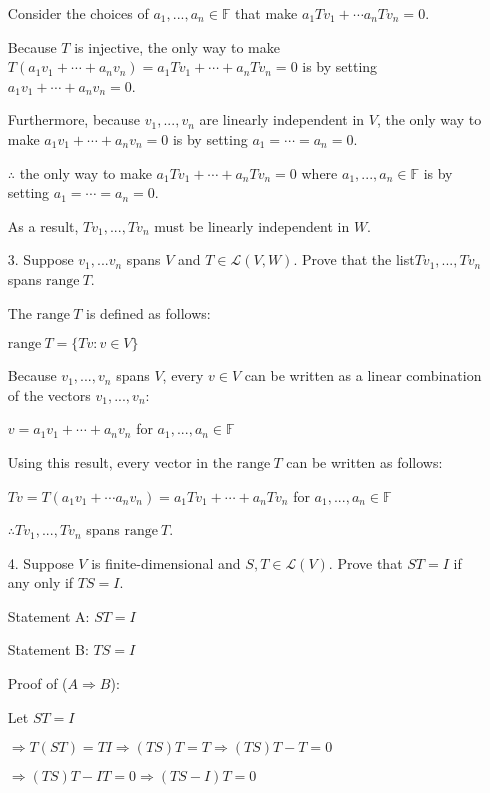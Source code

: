 \documentclass[fleqn]{article}
\begin{document}
\begin{enumerate}[nolistsep]
			Consider the choices of $a_1,...,a_n \in \mathbb{F}$ that make $a_1Tv_1 + \cdots a_nTv_n = 0$.
			
			Because $T$ is injective, the only way to make $T(a_1v_1 + \cdots + a_nv_n) = a_1Tv_1 + \cdots + a_nTv_n = 0$ is by setting $a_1v_1 + \cdots + a_nv_n = 0$.
			
			Furthermore, because $v_1,...,v_n$ are linearly independent in $V$, the only way to make $a_1v_1 + \cdots + a_nv_n = 0$ is by setting	$a_1 = \cdots = a_n = 0$.
			
			$\therefore$ the only way to make $a_1Tv_1 + \cdots + a_nTv_n = 0$ where $a_1,...,a_n \in \mathbb{F}$ is by setting $a_1 = \cdots = a_n = 0$.
			
			As a result, $Tv_1,...,Tv_n$ must be linearly independent in $W$.
	
		\item[3.] Suppose $v_1,...v_n$ spans $V$ and $T \in \mathcal{L}(V,W)$. Prove that the list\newline $Tv_1,...,Tv_n$ spans $\text{range}\ T$.

		The $\text{range}\ T$ is defined as follows:
		
		$\text{range}\ T = \{Tv : v \in V\}$
		
		Because $v_1,...,v_n$ spans $V$, every $v \in V$ can be written as a linear combination of the vectors $v_1,...,v_n$:
		
		$v = a_1v_1 + \cdots + a_nv_n$ for $a_1,...,a_n \in \mathbb{F}$
		
		Using this result, every vector in the $\text{range}\ T$ can be written as follows:
		
		$Tv = T(a_1v_1 + \cdots a_nv_n) = a_1Tv_1 + \cdots + a_nTv_n$ for $a_1,...,a_n \in \mathbb{F}$
		
		$\therefore Tv_1,...,Tv_n$ spans $\text{range}\ T$.
		
		\item[4.] Suppose $V$ is finite-dimensional and $S,T \in \mathcal{L}(V)$. Prove that $ST = I$ if any only if $TS = I$.
		
			Statement A: $ST = I$
			
			Statement B: $TS = I$
			
			\pagebreak
			Proof of ($A \Rightarrow B$):
			
			Let $ST = I$
			
			$\Rightarrow T(ST) = TI \Rightarrow (TS)T = T \Rightarrow (TS)T - T = 0$
			
			$\Rightarrow (TS)T - IT = 0 \Rightarrow (TS - I)T = 0$
			

\end{enumerate}
\end{document}
